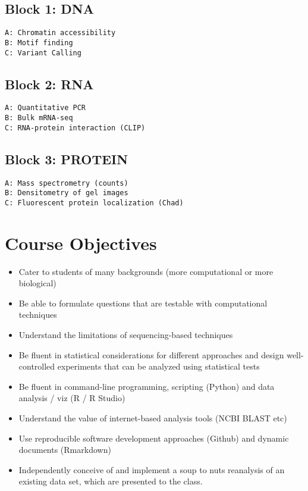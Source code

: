 \documentclass[]{book}
\providecommand{\tightlist}{%
  \setlength{\itemsep}{0pt}\setlength{\parskip}{0pt}}
\begin{document}
\subsection{Block 1: DNA}\label{block-1-dna}

\begin{verbatim}
A: Chromatin accessibility
B: Motif finding
C: Variant Calling
\end{verbatim}

\subsection{Block 2: RNA}\label{block-2-rna}

\begin{verbatim}
A: Quantitative PCR
B: Bulk mRNA-seq
C: RNA-protein interaction (CLIP)
\end{verbatim}

\subsection{Block 3: PROTEIN}\label{block-3-protein}

\begin{verbatim}
A: Mass spectrometry (counts)
B: Densitometry of gel images 
C: Fluorescent protein localization (Chad)
\end{verbatim}

\section{Course Objectives}\label{course-objectives}

\begin{itemize}
\tightlist
\item
  Cater to students of many backgrounds (more computational or more
  biological)
\item
  Be able to formulate questions that are testable with computational
  techniques
\item
  Understand the limitations of sequencing-based techniques
\item
  Be fluent in statistical considerations for different approaches and
  design well-controlled experiments that can be analyzed using
  statistical tests
\item
  Be fluent in command-line programming, scripting (Python) and data
  analysis / viz (R / R Studio)
\item
  Understand the value of internet-based analysis tools (NCBI BLAST etc)
\item
  Use reproducible software development approaches (Github) and dynamic
  documents (Rmarkdown)
\item
  Independently conceive of and implement a soup to nuts reanalysis of
  an existing data set, which are presented to the class.
\end{itemize}
\end{document}
